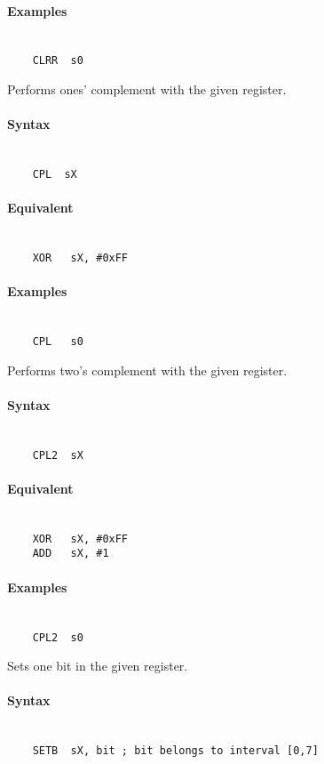     \paragraph{Examples}
        ~\\
        \verb'    CLRR  s0'

    Performs ones' complement with the given register.

    \paragraph{Syntax}
        ~\\
        \verb'    CPL  sX'

    \paragraph{Equivalent}
        ~\\
        \verb'    XOR   sX, #0xFF'

    \paragraph{Examples}
        ~\\
        \verb'    CPL   s0'

    Performs two's complement with the given register.

    \paragraph{Syntax}
        ~\\
        \verb'    CPL2  sX'

    \paragraph{Equivalent}
        ~\\
        \verb'    XOR   sX, #0xFF'\\
        \verb'    ADD   sX, #1'

    \paragraph{Examples}
        ~\\
        \verb'    CPL2  s0'

    Sets one bit in the given register.

    \paragraph{Syntax}
        ~\\
        \verb'    SETB  sX, bit ; bit belongs to interval [0,7]'


